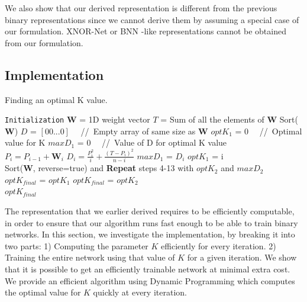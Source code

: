 \noindent We also show that our derived representation is different from the previous binary representations since we cannot derive them by assuming a special case of our formulation. XNOR-Net \cite{rastegari2016xnor} or BNN \cite{courbariaux2016binarized}-like representations cannot be obtained from our formulation.

\subsection{Implementation}

\begin{algorithm}[t]
\caption{ Finding an optimal K value. }
\begin{algorithmic}[1]
\State \texttt{Initialization}
\State $\mathbf{W}$ = 1D weight vector
\State $T$ = Sum of all the elements of $\mathbf{W}$
\State  Sort($\mathbf{W}$)
\State $D$ = $[0 0... 0]$ ~~//~{Empty array of same size as $\mathbf{W}$}
\State $optK_{1}$ = 0 ~~//~{Optimal value for K}
\State $maxD_{1}$ = 0 ~~//~{Value of D for optimal K value} \\

	\State $P_{i} = P_{i-1} + \mathbf{W}_{i}$
	\State $D_{i} = \frac{P_{i}^{2}}{i} + \frac{(T-P_{i})^{2}}{n-i}$
    \State $maxD_{1}$ = $D_{i}$
    \State $optK_{1}$ = i
    \EndIf
\EndFor
\\
\State Sort($\mathbf{W}$, reverse=true) and {\bf Repeat} steps 4-13 with $optK_{2}$ and $maxD_{2}$
\\
\State $optK_{final}$ = $optK_{1}$
\State $optK_{final}$ = $optK_{2}$
\EndIf
\\
 $optK_{final}$
\end{algorithmic}
\label{alg:partitionalgo}
\end{algorithm}

\noindent The representation that we earlier derived requires to be efficiently computable, in order to ensure that our algorithm runs fast enough to be able to train binary networks. In this section, we investigate the implementation, by breaking it into two parts: 1) Computing the parameter $K$ efficiently for every iteration. 2) Training the entire network using that value of $K$ for a given iteration. We show that it is possible to get an efficiently trainable network at minimal extra cost. We provide an efficient algorithm using Dynamic Programming which computes the optimal value for $K$ quickly at every iteration. \\

